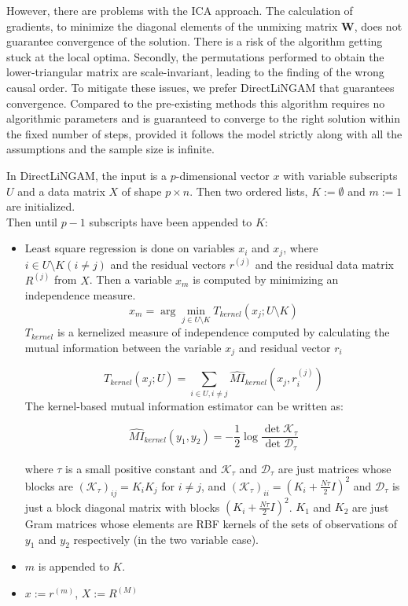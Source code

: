 \documentclass{article}
\begin{document}
However, there are problems with the ICA approach. The calculation of gradients, to minimize the diagonal elements of the unmixing matrix \textbf{W}, does not guarantee convergence of the solution. There is a risk of the algorithm getting stuck at the local optima. Secondly, the permutations performed to obtain the lower-triangular matrix are scale-invariant, leading to the finding of the wrong causal order. To mitigate these issues, we prefer DirectLiNGAM that guarantees convergence. Compared to the pre-existing methods this algorithm requires no algorithmic parameters and is guaranteed to converge to the right solution within the fixed number of steps, provided it follows the model strictly along with all the assumptions and the sample size is infinite. 


In DirectLiNGAM, the input is a $p$-dimensional vector $x$ with variable subscripts $U$ and a data matrix $X$ of shape $p \times n$. Then two ordered lists, $K := \emptyset$ and $m := 1$ are initialized.
\\
Then until $p-1$ subscripts have been appended to $K$:
\begin{itemize}
\item Least square regression is done on variables $x_i$ and $x_j$, where $i \in U \setminus K (i\neq j)$ and the residual vectors $r^{(j)}$ and the residual data matrix $R^{(j)}$ from $X$.
Then a variable $x_m$ is computed by minimizing an independence measure.
\begin{equation}
x_m = \arg \underset{j \in U \setminus K}{\min} T_{kernel}(x_j;U\setminus K)
\end{equation}
$T_{kernel}$ is a kernelized measure of independence computed by calculating the mutual information between the variable $x_j$ and residual vector $r_i$

\begin{equation}
    T_{kernel}(x_j;U) = \sum_{i \in U, i \neq j} \widehat{MI}_{kernel}(x_j, r_i^{(j)})
\end{equation}
The kernel-based mutual information estimator can be written as:

\begin{equation}
\widehat{MI}_{kernel}(y_1,y_2) = -\frac{1}{2}\log\frac{\det \mathcal{K}_\tau}{\det \mathcal{D}_\tau}
\end{equation}

where $\tau$ is a small positive constant and $\mathcal{K}_\tau$ and $\mathcal{D}_\tau$ are just matrices whose blocks are $(\mathcal{K}_\tau)_{ij} = K_iK_j$ for $i\neq j$, and $(\mathcal{K}_\tau)_{ii} = (K_i + \frac{N\tau}{2}I)^2$ and $\mathcal{D}_\tau$ is just a block diagonal matrix with blocks $(K_i+\frac{N\tau}{2}I)^2$. $K_1$ and $K_2$ are just Gram matrices whose elements are RBF kernels of the sets of observations of $y_1$ and $y_2$ respectively (in the two variable case). 

\item $m$ is appended to $K$.
\item $x:=r^{(m)}$, $X := R^{(M)}$
\end{itemize}
\end{document}
